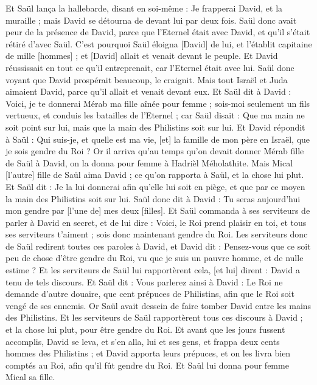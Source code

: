\begin{multicols}{2}
Et Saül lança la hallebarde, disant en soi-même : Je frapperai David, et la muraille ; mais David se détourna de devant lui par deux fois.
Saül donc avait peur de la présence de David, parce que l'Eternel était avec David, et qu'il s'était rétiré d'avec Saül.
C'est pourquoi Saül éloigna [David] de lui, et l'établit capitaine de mille [hommes] ; et [David] allait et venait devant le peuple.
Et David réussissait en tout ce qu'il entreprenait, car l'Eternel était avec lui.
Saül donc voyant que David prospérait beaucoup, le craignit.
Mais tout Israël et Juda aimaient David, parce qu'il allait et venait devant eux.
Et Saül dit à David : Voici, je te donnerai Mérab ma fille aînée pour femme ; sois-moi seulement un fils vertueux, et conduis les batailles de l'Eternel ; car Saül disait : Que ma main ne soit point sur lui, mais que la main des Philistins soit sur lui.
Et David répondit à Saül : Qui suis-je, et quelle est ma vie, [et] la famille de mon père en Israël, que je sois gendre du Roi ?
Or il arriva qu'au temps qu'on devait donner Mérab fille de Saül à David, on la donna pour femme à Hadrièl Méholathite.
Mais Mical [l'autre] fille de Saül aima David ; ce qu'on rapporta à Saül, et la chose lui plut.
Et Saül dit : Je la lui donnerai afin qu'elle lui soit en piège, et que par ce moyen la main des Philistins soit sur lui. Saül donc dit à David : Tu seras aujourd'hui mon gendre par [l'une de] mes deux [filles].
Et Saül commanda à ses serviteurs de parler à David en secret, et de lui dire : Voici, le Roi prend plaisir en toi, et tous ses serviteurs t'aiment ; sois donc maintenant gendre du Roi.
Les serviteurs donc de Saül redirent toutes ces paroles à David, et David dit : Pensez-vous que ce soit peu de chose d'être gendre du Roi, vu que je suis un pauvre homme, et de nulle estime ?
Et les serviteurs de Saül lui rapportèrent cela, [et lui] dirent : David a tenu de tels discours.
Et Saül dit : Vous parlerez ainsi à David : Le Roi ne demande d'autre douaire, que cent prépuces de Philistins, afin que le Roi soit vengé de ses ennemis. Or Saül avait dessein de faire tomber David entre les mains des Philistins.
Et les serviteurs de Saül rapportèrent tous ces discours à David ; et la chose lui plut, pour être gendre du Roi. Et avant que les jours fussent accomplis,
David se leva, et s'en alla, lui et ses gens, et frappa deux cents hommes des Philistins ; et David apporta leurs prépuces, et on les livra bien comptés au Roi, afin qu'il fût gendre du Roi. Et Saül lui donna pour femme Mical sa fille.

\end{multicols}
